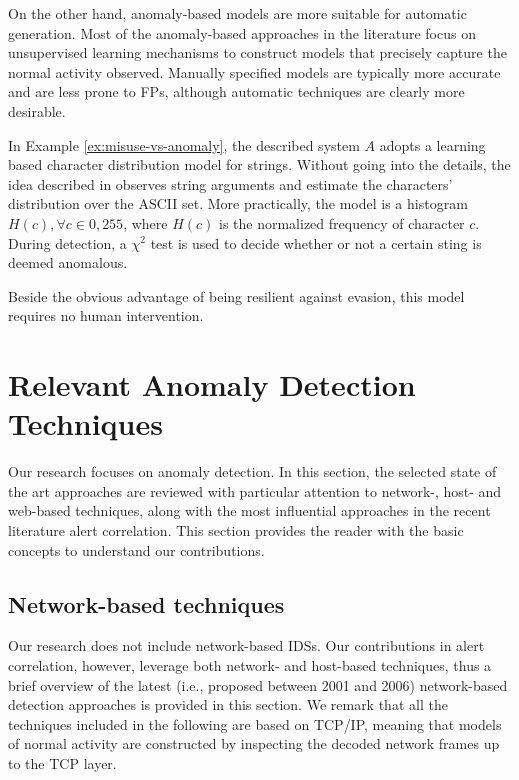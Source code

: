 On the other hand, anomaly-based models are more suitable for
automatic generation. Most of the anomaly-based approaches in the
literature focus on unsupervised learning mechanisms to construct
models that precisely capture the normal activity observed. Manually
specified models are typically more accurate and are less prone to
\acp{FP}, although automatic techniques are clearly more
desirable.

\begin{example}\label{ex:character-distribution-model}
  In Example \ref{ex:misuse-vs-anomaly}, the described system $A$
  adopts a learning based character distribution model for
  strings. Without going into the details, the idea described in
  \citep{mutz06:syscalls} observes string arguments and estimate the
  characters' distribution over the \ac{ASCII} set. More
  practically, the model is a histogram $H(c), \forall c \in {0,
  255}$, where $H(c)$ is the normalized frequency of character
  $c$. During detection, a $\chi^{2}$ test is used to decide whether
  or not a certain sting is deemed anomalous.

Beside the obvious advantage of being resilient against evasion, this
model requires no human intervention.
\end{example}

\section{Relevant Anomaly Detection Techniques}
\label{detection:ad} Our research focuses on anomaly detection. In
this section, the selected state of the art approaches are reviewed
with particular attention to network\hyp{}, host\hyp{} and
web\hyp{}based techniques, along with the most influential approaches
in the recent literature alert correlation. This section provides the
reader with the basic concepts to understand our contributions.

\subsection{Network-based techniques}
\label{detection:ad:network}
Our research does not include network-based \acp{IDS}. Our
contributions in alert correlation, however, leverage both network-
and host-based techniques, thus a brief overview of the latest (i.e.,
proposed between 2001 and 2006) network-based detection approaches is
provided in this section. We remark that all the techniques included
in the following are based on \ac{TCP}/IP, meaning that
models of normal activity are constructed by inspecting the decoded
network frames up to the \ac{TCP} layer.

